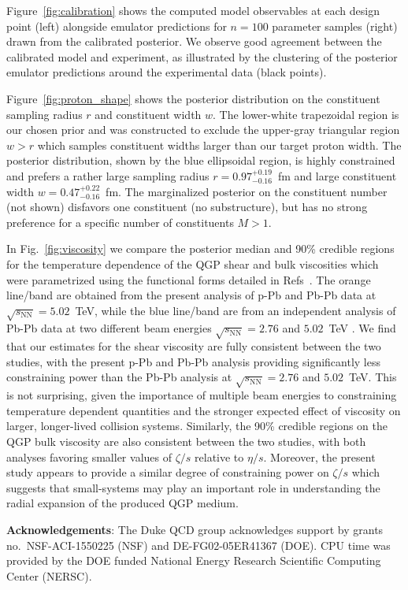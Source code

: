 \documentclass[3p,times,procedia,sort&compress]{elsarticle}
\newcommand{\sqrts}{\sqrt{s_\mathrm{NN}}}
\begin{document}
Figure~\ref{fig:calibration} shows the computed model observables at each design point (left) alongside emulator predictions for $n=100$ parameter samples (right) drawn from the calibrated posterior.
We observe good agreement between the calibrated model and experiment, as illustrated by the clustering of the posterior emulator predictions around the experimental data (black points).

Figure~\ref{fig:proton_shape} shows the posterior distribution on the constituent sampling radius $r$ and constituent width $w$.
The lower-white trapezoidal region is our chosen prior and was constructed to exclude the upper-gray triangular region $w > r$ which samples constituent widths larger than our target proton width.
The posterior distribution, shown by the blue ellipsoidal region, is highly constrained and prefers a rather large sampling radius $r=0.97_{-0.16}^{+0.19}$~fm and large constituent width $w=0.47_{-0.16}^{+0.22}$~fm.
The marginalized posterior on the constituent number (not shown) disfavors one constituent (no substructure), but has no strong preference for a specific number of constituents $M>1$.

In Fig.~\ref{fig:viscosity} we compare the posterior median and 90\% credible regions for the temperature dependence of the QGP shear and bulk viscosities which were parametrized using the functional forms detailed in Refs~\cite{Bass:2017zyn, Bernhard:2018hnz}.
The orange line/band are obtained from the present analysis of p-Pb and Pb-Pb data at $\sqrts=5.02$~TeV, while the blue line/band are from an independent analysis of Pb-Pb data at two different beam energies $\sqrts=2.76$ and $5.02$~TeV \cite{Bernhard:2018hnz}.
We find that our estimates for the shear viscosity are fully consistent between the two studies, with the present p-Pb and Pb-Pb analysis providing significantly less constraining power than the Pb-Pb analysis at $\sqrts=2.76$ and $5.02$~TeV.
This is not surprising, given the importance of multiple beam energies to constraining temperature dependent quantities and the stronger expected effect of viscosity on larger, longer-lived collision systems.
Similarly, the 90\% credible regions on the QGP bulk viscosity are also consistent between the two studies, with both analyses favoring smaller values of $\zeta/s$ relative to $\eta/s$.
Moreover, the present study appears to provide a similar degree of constraining power on $\zeta/s$ which suggests that small-systems may play an important role in understanding the radial expansion of the produced QGP medium.

\vspace{.5em}\noindent\textbf{Acknowledgements}:
The Duke QCD group acknowledges support by grants no.\ NSF-ACI-1550225 (NSF) and DE-FG02-05ER41367 (DOE).
CPU time was provided by the DOE funded National Energy Research Scientific Computing Center (NERSC).



\end{document}
